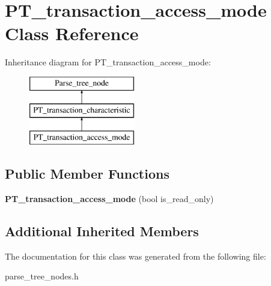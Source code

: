 \hypertarget{classPT__transaction__access__mode}{}\section{P\+T\+\_\+transaction\+\_\+access\+\_\+mode Class Reference}
\label{classPT__transaction__access__mode}
Inheritance diagram for P\+T\+\_\+transaction\+\_\+access\+\_\+mode\+:\begin{figure}[H]
\begin{center}
\leavevmode
\includegraphics[height=3.000000cm]{classPT__transaction__access__mode}
\end{center}
\end{figure}
\subsection*{Public Member Functions}
\begin{DoxyCompactItemize}
\item 
\mbox{\label{classPT__transaction__access__mode_abda9c66ff35d3da29bfd3d1671c9c8bb}} 
{\bfseries P\+T\+\_\+transaction\+\_\+access\+\_\+mode} (bool is\+\_\+read\+\_\+only)
\end{DoxyCompactItemize}
\subsection*{Additional Inherited Members}


The documentation for this class was generated from the following file\+:\begin{DoxyCompactItemize}
\item 
parse\+\_\+tree\+\_\+nodes.\+h\end{DoxyCompactItemize}
